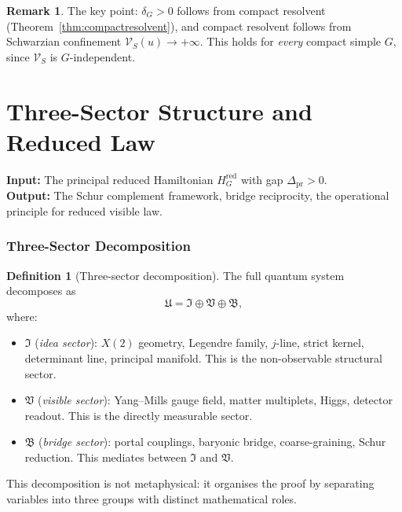 \documentclass[12pt]{article}
\theoremstyle{plain}
\theoremstyle{definition}
\newtheorem{definition}[theorem]{Definition}
\newtheorem{remark}[theorem]{Remark}
\numberwithin{equation}{section}
\newcommand{\fU}{\mathfrak{U}}
\newcommand{\fI}{\mathfrak{I}}
\newcommand{\fV}{\mathfrak{V}}
\newcommand{\fB}{\mathfrak{B}}
\newcommand{\pr}{\mathrm{pr}}
\newcommand{\red}{\mathrm{red}}
\begin{document}
\begin{remark}
The key point: $\delta_G>0$ follows from compact resolvent (Theorem~\ref{thm:compactresolvent}), and compact resolvent follows from Schwarzian confinement $\mathcal{V}_S(u)\to+\infty$.  This holds for \emph{every} compact simple $G$, since $\mathcal{V}_S$ is $G$-independent.
\end{remark}



\part{Three-Sector Structure and Reduced Law}

\noindent\textbf{Input:} The principal reduced Hamiltonian $H_G^{\red}$ with gap $\Delta_{\pr}>0$.\\
\textbf{Output:} The Schur complement framework, bridge reciprocity, the operational principle for reduced visible law.

\section{Three-Sector Decomposition}\label{sec:threesector}

\begin{definition}[Three-sector decomposition]
The full quantum system decomposes as
\begin{equation}
\fU = \fI \oplus \fV \oplus \fB,
\end{equation}
where:
\begin{itemize}
\item $\fI$ (\emph{idea sector}): $X(2)$ geometry, Legendre family, $j$-line, strict kernel, determinant line, principal manifold.  This is the non-observable structural sector.
\item $\fV$ (\emph{visible sector}): Yang--Mills gauge field, matter multiplets, Higgs, detector readout.  This is the directly measurable sector.
\item $\fB$ (\emph{bridge sector}): portal couplings, baryonic bridge, coarse-graining, Schur reduction.  This mediates between $\fI$ and $\fV$.
\end{itemize}
\end{definition}

This decomposition is not metaphysical: it organises the proof by separating variables into three groups with distinct mathematical roles.
\end{document}
